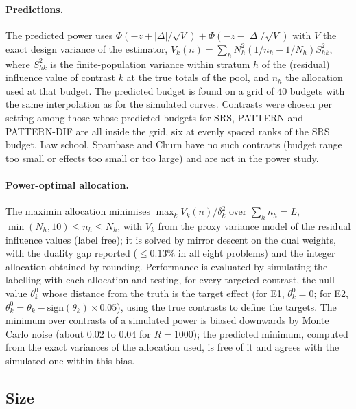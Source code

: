 \paragraph{Predictions.} The predicted power uses $\Phi(-z+|\Delta|/\sqrt V)+\Phi(-z-|\Delta|/\sqrt V)$ with $V$ the exact design variance of the estimator, $V_k(n)=\sum_hN_h^2(1/n_h-1/N_h)S^2_{hk}$, where $S^2_{hk}$ is the finite-population variance within stratum $h$ of the (residual) influence value of contrast $k$ at the true totals of the pool, and $n_h$ the allocation used at that budget. The predicted budget is found on a grid of $40$ budgets with the same interpolation as for the simulated curves. Contrasts were chosen per setting among those whose predicted budgets for SRS, PATTERN and PATTERN-DIF are all inside the grid, six at evenly spaced ranks of the SRS budget. Law school, Spambase and Churn have no such contrasts (budget range too small or effects too small or too large) and are not in the power study.

\paragraph{Power-optimal allocation.} The maximin allocation minimises $\max_kV_k(n)/\delta_k^2$ over $\sum_hn_h=L$, $\min(N_h,10)\le n_h\le N_h$, with $V_k$ from the proxy variance model of the residual influence values (label free); it is solved by mirror descent on the dual weights, with the duality gap reported ($\le0.13\%$ in all eight problems) and the integer allocation obtained by rounding. Performance is evaluated by simulating the labelling with each allocation and testing, for every targeted contrast, the null value $\theta^0_k$ whose distance from the truth is the target effect (for E1, $\theta^0_k=0$; for E2, $\theta_k^0=\theta_k-\mathrm{sign}(\theta_k)\times0.05$), using the true contrasts to define the targets. The minimum over contrasts of a simulated power is biased downwards by Monte Carlo noise (about $0.02$ to $0.04$ for $R=1000$); the predicted minimum, computed from the exact variances of the allocation used, is free of it and agrees with the simulated one within this bias.

\subsection{Size}

\begin{table}[p]
\centering\scriptsize
\caption{Size of the two-sided Wald test of the true value, mean and maximum over $108$ contrasts, by design, budget and level ($R=1000$). ``Pool, cond.'': pool-conditional test of the pool contrast. ``Pop., two-phase'': two-phase test of the population contrast. The maximum of a calibrated test has mean $0.019$, $0.068$, $0.125$ at $\alpha=0.01$, $0.05$, $0.10$.}\label{tab:test-size-full}

\end{table}

